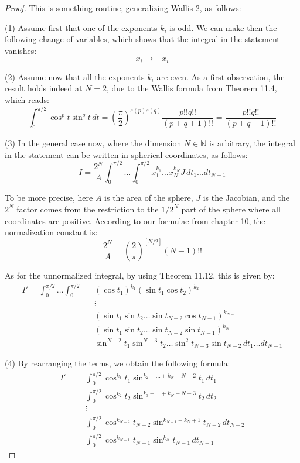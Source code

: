 \documentclass[12pt]{amsbook}
\begin{document}
\begin{proof}
This is something routine, generalizing Wallis 2, as follows:

\medskip

(1) Assume first that one of the exponents $k_i$ is odd. We can make then the following change of variables, which shows that the integral in the statement vanishes:
$$x_i\to-x_i$$

(2) Assume now that all the exponents $k_i$ are even. As a first observation, the result holds indeed at $N=2$, due to the Wallis formula from Theorem 11.4, which reads:
$$\int_0^{\pi/2}\cos^pt\sin^qt\,dt
=\left(\frac{\pi}{2}\right)^{\varepsilon(p)\varepsilon(q)}\frac{p!!q!!}{(p+q+1)!!}
=\frac{p!!q!!}{(p+q+1)!!}$$

(3) In the general case now, where the dimension $N\in\mathbb N$ is arbitrary, the integral in the statement can be written in spherical coordinates, as follows:
$$I=\frac{2^N}{A}\int_0^{\pi/2}\ldots\int_0^{\pi/2}x_1^{k_1}\ldots x_N^{k_N}J\,dt_1\ldots dt_{N-1}$$

To be more precise, here $A$ is the area of the sphere, $J$ is the Jacobian, and the $2^N$ factor comes from the restriction to the $1/2^N$ part of the sphere where all coordinates are positive. According to our formulae from chapter 10, the normalization constant is:
$$\frac{2^N}{A}=\left(\frac{2}{\pi}\right)^{[N/2]}(N-1)!!$$

As for the unnormalized integral, by using Theorem 11.12, this is given by:
\begin{eqnarray*}
I'=\int_0^{\pi/2}\ldots\int_0^{\pi/2}
&&(\cos t_1)^{k_1}
(\sin t_1\cos t_2)^{k_2}\\
&&\vdots\\
&&(\sin t_1\sin t_2\ldots\sin t_{N-2}\cos t_{N-1})^{k_{N-1}}\\
&&(\sin t_1\sin t_2\ldots\sin t_{N-2}\sin t_{N-1})^{k_N}\\
&&\sin^{N-2}t_1\sin^{N-3}t_2\ldots\sin^2t_{N-3}\sin t_{N-2}\,dt_1\ldots dt_{N-1}
\end{eqnarray*}

(4) By rearranging the terms, we obtain the following formula:
\begin{eqnarray*}
I'
&=&\int_0^{\pi/2}\cos^{k_1}t_1\sin^{k_2+\ldots+k_N+N-2}t_1\,dt_1\\
&&\int_0^{\pi/2}\cos^{k_2}t_2\sin^{k_3+\ldots+k_N+N-3}t_2\,dt_2\\
&&\vdots\\
&&\int_0^{\pi/2}\cos^{k_{N-2}}t_{N-2}\sin^{k_{N-1}+k_N+1}t_{N-2}\,dt_{N-2}\\
&&\int_0^{\pi/2}\cos^{k_{N-1}}t_{N-1}\sin^{k_N}t_{N-1}\,dt_{N-1}
\end{eqnarray*}


\end{proof}
\end{document}
